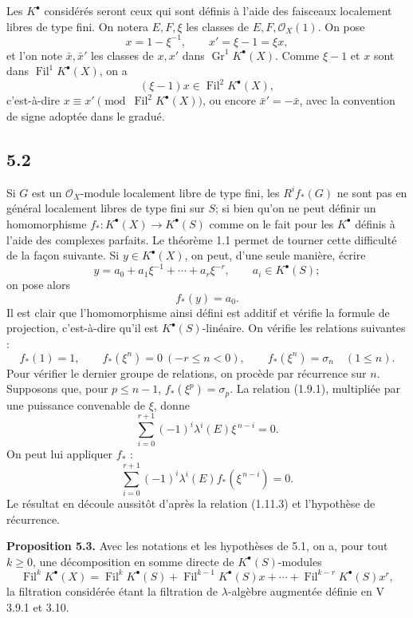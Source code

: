 \documentclass[11pt]{article}
\newcommand{\Fil}{\operatorname{Fil}}
\begin{document}
Les \(K^\bullet\) considérés seront ceux qui sont définis à l'aide des faisceaux localement libres de type fini. On notera \(E,F,\xi\) les classes de \(E,F,\mathcal O_X(1)\). On pose
\[
  x=1-\xi^{-1},\qquad x'=\xi-1=\xi x,
\]
et l'on note \(\bar x,\bar x'\) les classes de \(x,x'\) dans \(\operatorname{Gr}^1K^\bullet(X)\). Comme \(\xi-1\) et \(x\) sont dans \(\Fil^1K^\bullet(X)\), on a
\[
  (\xi-1)x\in\Fil^2K^\bullet(X),
\]
c'est-à-dire \(x\equiv x'\pmod{\Fil^2K^\bullet(X)}\), ou encore \(\bar x'=-\bar x\), avec la convention de signe adoptée dans le gradué.

\subsection*{5.2}
Si \(G\) est un \(\mathcal O_X\)-module localement libre de type fini, les \(R^if_*(G)\) ne sont pas en général localement libres de type fini sur \(S\); si bien qu'on ne peut définir un homomorphisme \(f_*:K^\bullet(X)\to K^\bullet(S)\) comme on le fait pour les \(K^\bullet\) définis à l'aide des complexes parfaits. Le théorème 1.1 permet de tourner cette difficulté de la façon suivante. Si \(y\in K^\bullet(X)\), on peut, d'une seule manière, écrire
\begin{equation}\tag{5.2.1}
  y=a_0+a_1\xi^{-1}+\cdots+a_r\xi^{-r},
  \qquad a_i\in K^\bullet(S);
\end{equation}
on pose alors
\begin{equation}\tag{5.2.2}
  f_*(y)=a_0.
\end{equation}
Il est clair que l'homomorphisme ainsi défini est additif et vérifie la formule de projection, c'est-à-dire qu'il est \(K^\bullet(S)\)-linéaire. On vérifie les relations suivantes :
\begin{equation}\tag{5.2.3}
 f_*(1)=1,\qquad f_*(\xi^n)=0\ (-r\leq n<0),\qquad
 f_*(\xi^n)=\sigma_n\quad (1\leq n).
\end{equation}
Pour vérifier le dernier groupe de relations, on procède par récurrence sur \(n\). Supposons que, pour \(p\leq n-1\), \(f_*(\xi^p)=\sigma_p\). La relation (1.9.1), multipliée par une puissance convenable de \(\xi\), donne
\[
  \sum_{i=0}^{r+1}(-1)^i\lambda^i(E)\xi^{\,n-i}=0.
\]
On peut lui appliquer \(f_*\) :
\[
  \sum_{i=0}^{r+1}(-1)^i\lambda^i(E)f_*(\xi^{\,n-i})=0.
\]
Le résultat en découle aussitôt d'après la relation (1.11.3) et l'hypothèse de récurrence.

\textbf{Proposition 5.3.} Avec les notations et les hypothèses de 5.1, on a, pour tout \(k\geq0\), une décomposition en somme directe de \(K^\bullet(S)\)-modules
\[
  \Fil^kK^\bullet(X)=
  \Fil^kK^\bullet(S)+\Fil^{k-1}K^\bullet(S)x+\cdots+
  \Fil^{k-r}K^\bullet(S)x^r,
\]
la filtration considérée étant la filtration de \(\lambda\)-algèbre augmentée définie en V 3.9.1 et 3.10.
\end{document}
